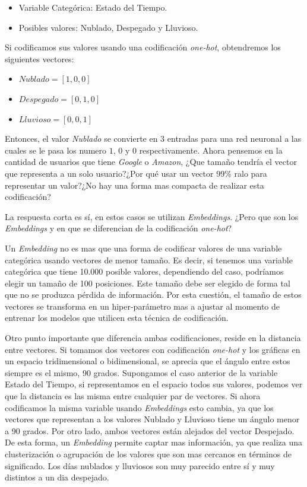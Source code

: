 \documentclass[11pt,a4paper,twoside]{thesis}
\begin{document}
\begin{itemize}
	\item Variable Categórica: Estado del Tiempo.
	\item Posibles valores: Nublado, Despegado y Lluvioso.
\end{itemize}

Si codificamos sus valores usando una codificación \textit{one-hot},
obtendremos los siguientes vectores:

\begin{itemize}
	\item $Nublado    = [1, 0, 0]$
	\item $Despegado  = [0, 1, 0]$
	\item $Lluvioso   = [0, 0, 1]$
\end{itemize}

Entonces, el valor \textit{Nublado} se convierte en 3 entradas para una red
neuronal a las cuales se le pasa los numero $1$, $0$ y $0$ respectivamente.
Ahora pensemos en la cantidad de usuarios que tiene \textit{Google} o
\textit{Amazon}, ¿Que tamaño tendría el vector que representa a un solo
usuario?¿Por qué usar un vector 99\% ralo para representar un valor?¿No hay una
forma mas compacta de realizar esta codificación?

La respuesta corta es sí, en estos casos se utilizan \textit{Embeddings}. ¿Pero
que son los \textit{Embeddings} y en que se diferencian de la codificación
\textit{one-hot}?

Un \textit{Embedding} no es mas que una forma de codificar valores de una
variable categórica usando vectores de menor tamaño. Es decir, si tenemos una
variable categórica que tiene 10.000 posible valores, dependiendo del caso,
podríamos elegir un tamaño de 100 posiciones. Este tamaño debe ser elegido de
forma tal que no se produzca pérdida de información. Por esta cuestión, el
tamaño de estos vectores se transforma en un hiper-parámetro mas a ajustar al
momento de entrenar los modelos que utilicen esta técnica de codificación.

Otro punto importante que diferencia ambas codificaciones, reside en la
distancia entre vectores. Si tomamos dos vectores con codificación
\textit{one-hot} y los gráficas en un espacio tridimensional o bidimensional,
se aprecia que el ángulo entre estos siempre es el mismo, 90 grados. Supongamos
el caso anterior de la variable Estado del Tiempo, si representamos en el
espacio todos sus valores, podemos ver que la distancia es las misma entre
cualquier par de vectores. Si ahora codificamos la misma variable usando
\textit{Embeddings} esto cambia, ya que los vectores que representan a los
valores Nublado y Lluvioso tiene un ángulo menor a 90 grados. Por otro lado,
ambos vectores están alejados del vector Despejado. De esta forma, un
\textit{Embedding} permite captar mas información, ya que realiza una
clusterización o agrupación de los valores que son mas cercanos en términos de
significado. Los días nublados y lluviosos son muy parecido entre sí y muy
distintos a un dia despejado.
\end{document}
